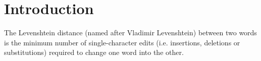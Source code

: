 \chapter*{Introduction}
	\thispagestyle{introduction}
	 The Levenshtein distance (named after Vladimir Levenshtein) \cite{levenshtein-distance} between two words is the minimum number of single-character edits (i.e. insertions, deletions or substitutions) required to change one word into the other.